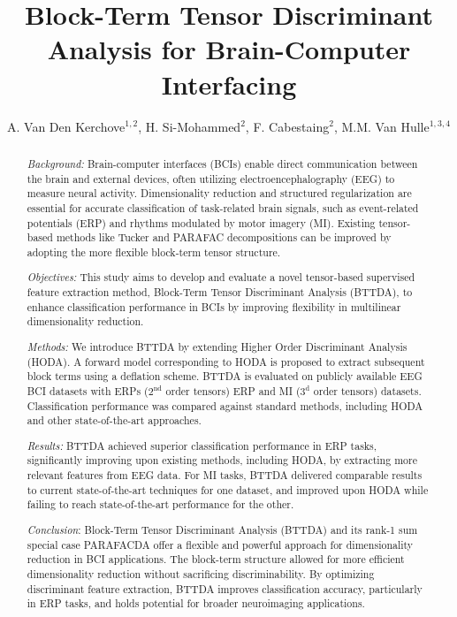 \documentclass[10pt]{iopart}
\begin{document}
\title{Block-Term Tensor Discriminant Analysis for Brain-Computer Interfacing}
\author{%
  A. Van Den Kerchove$^{1,2}$,
  H. Si-Mohammed$^{2}$,
  F. Cabestaing$^{2}$,
  M.M. Van Hulle$^{1,3,4}$
}

\address{$^1$
  KU Leuven,
  Department of Neurosciences,
  Laboratory for Neuro- and Psychophysiology,
  Campus Gasthuisberg O\&N2,
  Herestraat 49 bus 1021,
  BE-3000 Leuven,
  Belgium
}
\address{$^2$
  Univ.Lille, CNRS, Centrale Lille,
  UMR 9189 CRIStAL,
  F-59000 Lille,
  France
}
\address{$^3$ Leuven.AI}
\address{$^4$ Leuven Brain Institute}


\begin{abstract}

  \noindent\emph{Background:}
  Brain-computer interfaces (BCIs) enable direct communication between the
  brain and external devices, often utilizing electroencephalography (EEG) to
  measure neural activity.
  Dimensionality reduction and structured regularization are essential for
  accurate classification of task-related brain signals, such as event-related
  potentials (ERP) and rhythms modulated by motor imagery (MI).
  Existing tensor-based methods like Tucker and PARAFAC decompositions can be
  improved by adopting the more flexible block-term tensor structure.

  \noindent\emph{Objectives:}
  This study aims to develop and evaluate a novel tensor-based supervised
  feature extraction method, Block-Term Tensor Discriminant Analysis (BTTDA),
  to enhance classification performance in BCIs by improving flexibility in
  multilinear dimensionality reduction.

  \noindent\emph{Methods:}
  We introduce BTTDA by extending Higher Order Discriminant Analysis (HODA).
  A forward model corresponding to HODA is proposed to extract subsequent block terms using a
  deflation scheme.
  BTTDA is evaluated on publicly available EEG BCI datasets with ERPs
  ($2^\text{nd}$ order tensors) ERP and MI ($3^\text{d}$ order tensors) datasets.
  Classification performance was compared against standard methods, including HODA
  and other state-of-the-art approaches.

  \noindent\emph{Results:}
  BTTDA achieved superior classification performance in ERP tasks, significantly
  improving upon existing methods, including HODA, by extracting more relevant features from EEG data.
  For MI tasks, BTTDA delivered comparable results to current state-of-the-art
  techniques for one dataset, and improved upon HODA while failing to reach
  state-of-the-art performance for the other.

  \emph{Conclusion}:
  Block-Term Tensor Discriminant Analysis (BTTDA) and its rank-1 sum special case
  PARAFACDA offer a flexible and powerful approach for dimensionality reduction
  in BCI applications.
  The block-term structure allowed for more efficient dimensionality reduction
  without sacrificing discriminability.
  By optimizing discriminant feature extraction, BTTDA improves classification
  accuracy, particularly in ERP tasks, and holds potential for broader
  neuroimaging applications.
\end{abstract}
\end{document}
